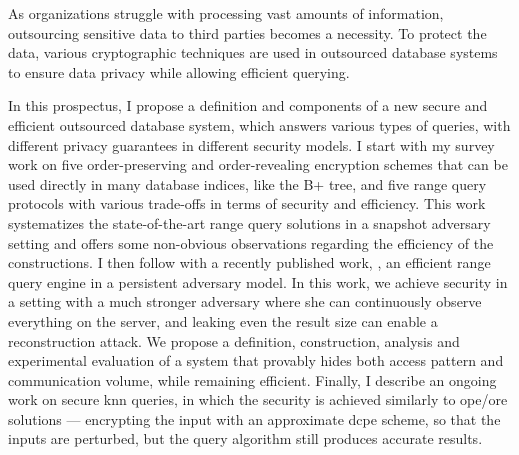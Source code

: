As organizations struggle with processing vast amounts of information, outsourcing sensitive data to third parties becomes a necessity.
To protect the data, various cryptographic techniques are used in outsourced database systems to ensure data privacy while allowing efficient querying.

In this prospectus, I propose a definition and components of a new secure and efficient outsourced database system, which answers various types of queries, with different privacy guarantees in different security models.
I start with my survey work on five order-preserving and order-revealing encryption schemes that can be used directly in many database indices, like the B+ tree, and five range query protocols with various trade-offs in terms of security and efficiency.
This work systematizes the state-of-the-art range query solutions in a snapshot adversary setting and offers some non-obvious observations regarding the efficiency of the constructions.
I then follow with a recently published work, \epsolute{}, an efficient range query engine in a persistent adversary model.
In this work, we achieve security in a setting with a much stronger adversary where she can continuously observe everything on the server, and leaking even the result size can enable a reconstruction attack.
We propose a definition, construction, analysis and experimental evaluation of a system that provably hides both access pattern and communication volume, while remaining efficient.
Finally, I describe an ongoing work on secure \acrlong{knn} queries, in which the security is achieved similarly to \acrshort{ope}/\acrshort{ore} solutions --- encrypting the input with an approximate \acrlong{dcpe} scheme, so that the inputs are perturbed, but the query algorithm still produces accurate results.
